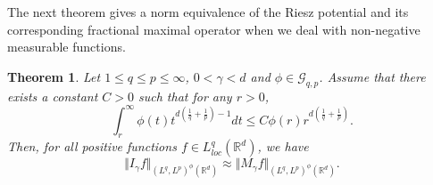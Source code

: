 \documentclass[10pt,a4paper]{amsart}
\numberwithin{equation}{section}
\newtheorem{theorem}{Theorem}[section]
\numberwithin{equation}{section}
\begin{document}
The next theorem gives a norm equivalence of the Riesz potential and its corresponding fractional maximal operator when we deal with non-negative
measurable functions. 
\begin{theorem}
\label{Theo 3.4}
Let $1\leq  q \leq p \leq \infty$, $0<\gamma< d$ and $\phi \in \mathcal{G}_{q,p}$. Assume that there exists a constant $ C>0 $ such that for any $ r>0 $,
\begin{equation}\label{eq 44}
 \displaystyle\int_{r}^{\infty} \phi(t)t^{d(\frac{1}{q}+\frac{1}{p})-1} dt \leq C   \phi(r)r^{d(\frac{1}{q}+\frac{1}{p})}.
\end{equation}
 Then, for all positive functions $ f \in L_{loc}^{q}(\mathbb{R}^{d})$, we have
$$ \Vert I_{\gamma}f \Vert_{(L^{q},L^{p})^{\phi}(\mathbb{R}^{d})}  \approx   \Vert M_{\gamma}f \Vert_{(L^{q},L^{p})^{\phi}(\mathbb{R}^{d})}. $$
\end{theorem}
\end{document}
